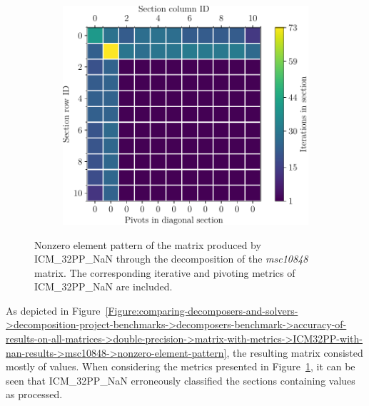 \begin{figure}[ht!]
\begin{subfigure}[t]{0.51\textwidth}
		\includegraphics[width=\textwidth, keepaspectratio, clip]{images/ch03/input-matrices/decomposition-benchmarks/msc10848_icm32pp_nan_metrics.pdf}
		\label{Figure:comparing-decomposers-and-solvers->decomposition-project-benchmarks->decomposers-benchmark->accuracy-of-results-on-all-matrices->double-precision->matrix-with-metrics->ICM32PP-with-nan-results->msc10848->metrics}
	\end{subfigure}
	\caption{Nonzero element pattern of the  matrix produced by ICM\_32PP\_NaN through the decomposition of the \textit{msc10848} matrix.
		The corresponding iterative and pivoting metrics of ICM\_32PP\_NaN are included.
	}
	\label{Figure:comparing-decomposers-and-solvers->decomposition-project-benchmarks->decomposers-benchmark->accuracy-of-results-on-all-matrices->double-precision->matrix-with-metrics->ICM32PP-with-nan-results->msc10848}
\end{figure}

As depicted in Figure~\ref{Figure:comparing-decomposers-and-solvers->decomposition-project-benchmarks->decomposers-benchmark->accuracy-of-results-on-all-matrices->double-precision->matrix-with-metrics->ICM32PP-with-nan-results->msc10848->nonzero-element-pattern}, the resulting matrix consisted mostly of  values.
When considering the metrics presented in Figure~\ref{Figure:comparing-decomposers-and-solvers->decomposition-project-benchmarks->decomposers-benchmark->accuracy-of-results-on-all-matrices->double-precision->matrix-with-metrics->ICM32PP-with-nan-results->msc10848->metrics}, it can be seen that ICM\_32PP\_NaN erroneously classified the sections containing  values as processed.


